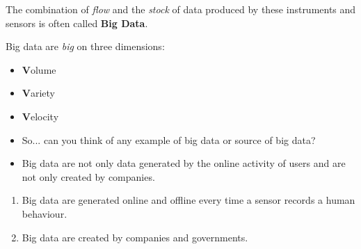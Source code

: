 \documentclass[serif, aspectratio=169]{beamer}
\begin{document}
\begin{frame}

The combination of \textit{flow} and the \textit{stock} of data produced by these instruments and sensors is often called \textbf{Big Data}. 

Big data are \textit{big} on three dimensions: 

\begin{itemize}

\item \textbf{V}olume
\item \textbf{V}ariety
\item \textbf{V}elocity

\end{itemize}

\end{frame}

\begin{frame}

\begin{itemize}

\item<1> So... can you think of any example of big data or source of big data? 

\end{itemize}

\begin{itemize}

\item<2-> Big data are not only data generated by the online activity of users and are not only created by companies. 

\end{itemize}

\begin{enumerate}

\item<3-> Big data are generated online and offline every time a sensor records a human behaviour. 

\item<4-> Big data are created by companies and governments.

\end{enumerate}

\end{frame}
\end{document}
